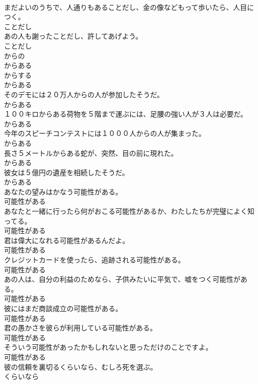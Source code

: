 \documentclass[8pt]{extreport}
\begin{document}
\begin{CJK}{UTF8}{min}
\\	まだよいのうちで、人通りもあることだし、金の像などもって歩いたら、人目につく。	
\\	ことだし	
\\	あの人も謝ったことだし、許してあげよう。	
\\	ことだし	
\\	からの 
\\	からある 
\\	からする 
\\	からある	
\\	そのデモには２０万人からの人が参加したそうだ。	
\\	からある	
\\	１００キロからある荷物を５階まで運ぶには、足腰の強い人が３人は必要だ。	
\\	からある	
\\	今年のスピーチコンテストには１０００人からの人が集まった。	
\\	からある	
\\	長さ５メートルからある蛇が、突然、目の前に現れた。	
\\	からある	
\\	彼女は５億円の遺産を相続したそうだ。	
\\	からある	
\\	あなたの望みはかなう可能性がある。	
\\	可能性がある	
\\	あなたと一緒に行ったら何がおこる可能性があるか、わたしたちが完璧によく知ってる。	
\\	可能性がある	
\\	君は偉大になれる可能性があるんだよ。	
\\	可能性がある	
\\	クレジットカードを使ったら、追跡される可能性がある。	
\\	可能性がある	
\\	あの人は、自分の利益のためなら、子供みたいに平気で、嘘をつく可能性がある。	
\\	可能性がある	
\\	彼にはまだ商談成立の可能性がある。	
\\	可能性がある	
\\	君の愚かさを彼らが利用している可能性がある。	
\\	可能性がある	
\\	そういう可能性があったかもしれないと思っただけのことですよ。	
\\	可能性がある	
\\	彼の信頼を裏切るくらいなら、むしろ死を選ぶ。	
\\	くらいなら	

\end{CJK}
\end{document}
